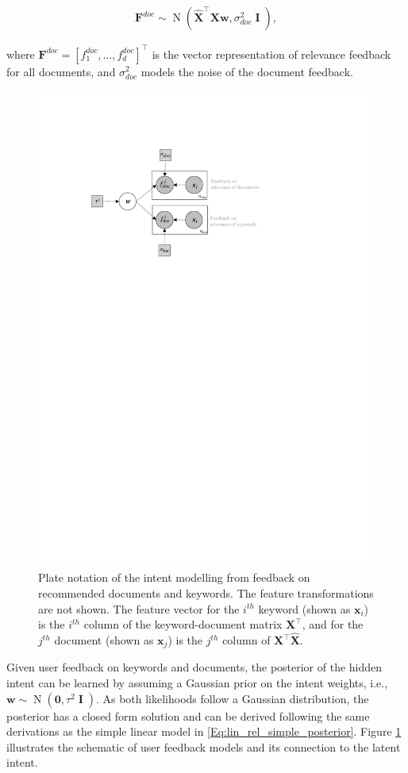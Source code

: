 \documentclass[dissertation,math,vertlayout,pdfa,colorlinks]{aaltoseries}
\newcommand{\bw}{\bm{w}}
\DeclareMathOperator{\eye}{\textbf{I}}
\DeclareMathOperator{\normalpdf}{N}
\newcommand{\tp}{^{\top}}
\begin{document}
\begin{align}\label{Eq:doc_key_relation_vector} 
\bm{F}^{doc} \sim \normalpdf(  \hat{\bm{X}}\tp \bm{X} \bw, \sigma_{doc}^2 \eye),
\end{align}  

\noindent where $\bm{F}^{doc}=[f_{1}^{doc},\ldots,f_{d}^{doc}]\tp$ is the vector representation of relevance feedback for all documents, and $\sigma_{doc}^2$ models the noise of the document feedback. 

\begin{figure}
	\centering
	\includegraphics[width=0.80\linewidth]{Figures/Plate_diagram_intent_kd.pdf}
	\caption{Plate notation of the intent modelling from feedback on recommended documents and keywords. The feature transformations are not shown. The feature vector for the $i^{th}$ keyword (shown as $\bm{x}_i$) is the $i^{th}$ column of the keyword-document matrix $\bm{X}\tp$, and for the $j^{th}$ document (shown as $\bm{x}_j$) is the $j^{th}$ column of $\bm{X}\tp\hat{\bm{X}}$.}
	\label{fig:Plate_intent_kd}
\end{figure}

Given user feedback on keywords and documents, the posterior of the hidden intent can be learned by assuming a Gaussian prior on the intent weights, i.e., $\bw \sim \normalpdf(\bm{0},\tau^2 \eye)$. As both likelihoods follow a Gaussian distribution, the posterior has a closed form solution and can be derived following the same derivations as the simple linear model in \ref{Eq:lin_rel_simple_posterior}. Figure \ref{fig:Plate_intent_kd} illustrates the schematic of user feedback models and its connection to the latent intent. 
\end{document}
